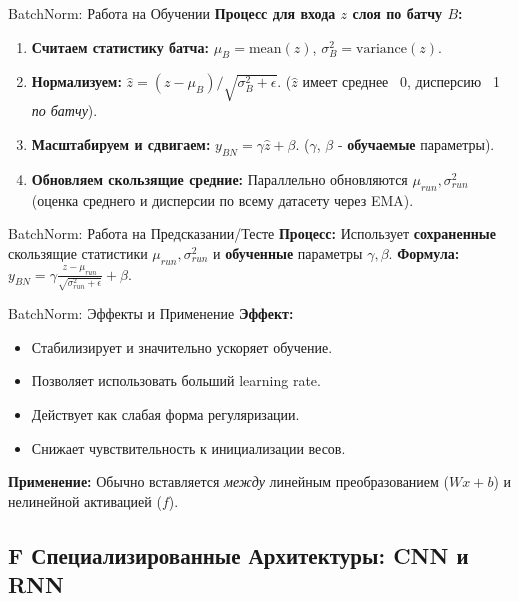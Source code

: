 \begin{myexampleblock}{BatchNorm: Работа на Обучении}
    \textbf{Процесс для входа $z$ слоя по батчу $B$:}
    \begin{enumerate}[nosep, itemsep=0.5ex]
        \item \textbf{Считаем статистику батча:} $\mu_B = \text{mean}(z)$, $\sigma^2_B = \text{variance}(z)$.
        \item \textbf{Нормализуем:} $\hat{z} = (z - \mu_B) / \sqrt{\sigma^2_B + \epsilon}$. ($\hat{z}$ имеет среднее ~0, дисперсию ~1 \textit{по батчу}).
        \item \textbf{Масштабируем и сдвигаем:} $y_{BN} = \gamma \hat{z} + \beta$. ($\gamma$, $\beta$ - \textbf{обучаемые} параметры).
        \item \textbf{Обновляем скользящие средние:} Параллельно обновляются $\mu_{run}, \sigma^2_{run}$ (оценка среднего и дисперсии по всему датасету через EMA).
    \end{enumerate}
\end{myexampleblock}

\begin{myexampleblock}{BatchNorm: Работа на Предсказании/Тесте}
    \textbf{Процесс:} Использует \textbf{сохраненные} скользящие статистики $\mu_{run}, \sigma^2_{run}$ и \textbf{обученные} параметры $\gamma, \beta$.
    \textbf{Формула:} $y_{BN} = \gamma \frac{z - \mu_{run}}{\sqrt{\sigma^2_{run} + \epsilon}} + \beta$.
\end{myexampleblock}

\begin{myexampleblock}{BatchNorm: Эффекты и Применение}
    \textbf{Эффект:}
    \begin{itemize}[nosep, leftmargin=*]
        \item Стабилизирует и значительно ускоряет обучение.
        \item Позволяет использовать больший learning rate.
        \item Действует как слабая форма регуляризации.
        \item Снижает чувствительность к инициализации весов.
    \end{itemize}
    \textbf{Применение:} Обычно вставляется \textit{между} линейным преобразованием ($W x + b$) и нелинейной активацией ($f$).
\end{myexampleblock}

\subsection{F Специализированные Архитектуры: CNN и RNN}

